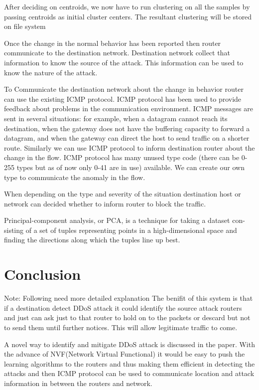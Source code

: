 \documentclass[10pt,oneside,a4paper]{article}
\begin{document}
After deciding on centroids, we now have to run clustering on all the samples by passing centroids as initial cluster centers. The resultant clustering will be stored on file system

Once the change in the normal behavior has been reported then router communicate to the destination network. Destination network collect that information to know the source of the attack. This information can be used to know the nature of the attack.

To Communicate the destination network about the change in behavior router can use the existing ICMP protocol. ICMP protocol has been used to provide feedback about problems in the communication environment. ICMP messages are sent in several situations:  for example, when a datagram cannot reach its destination, when the gateway does not have the buffering capacity to forward a datagram, and when the gateway can direct the host to send traffic on a shorter route.\cite{icmp} Similarly we can use ICMP protocol to inform destination router about the change in the flow. ICMP protocol has many unused type code (there can be 0-255 types but as of now only 0-41 are in use) available. We can create our own type to communicate the anomaly in the flow.

When depending on the type and severity of the situation destination host or network can decided whether to inform router to block the traffic.


Principal-component analysis, or PCA, is a technique for taking a dataset con-
sisting of a set of tuples representing points in a high-dimensional space and
finding the directions along which the tuples line up best.

\section{Conclusion}

{Note: Following need more detailed explanation}
The benifit of this system is that if a destination detect DDoS attack it could identify the source attack routers and just can ask just to that router to hold on to the packets or descard but not to send them until further notices. This will allow legitimate traffic to come.

A novel way to identify and mitigate DDoS attack is discussed in the paper. With the advance of NVF(Network Virtual Functional) it would be easy to push the learning algorithms to the routers and thus making them efficient in detecting the attacks and then ICMP protocol can be used to communicate location and attack information in between the routers and network.

\end{document}
